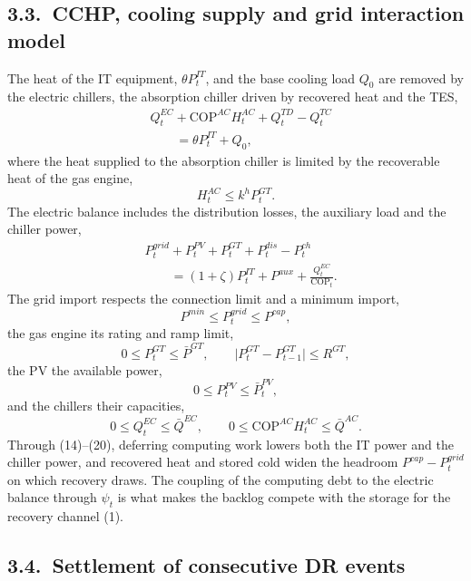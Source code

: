 \documentclass[a4paper,twocolumn,fleqn,10pt]{article}
\begin{document}
\subsection*{3.3.~CCHP, cooling supply and grid interaction model}

The heat of the IT equipment, \(\theta P^{IT}_t\), and the base cooling load \(Q_0\) are removed by the electric chillers, the absorption chiller driven by recovered heat and the TES, \[\begin{aligned}&Q^{EC}_t+\mathrm{COP}^{AC}H^{AC}_t+Q^{TD}_t-Q^{TC}_t\\&\qquad=\theta P^{IT}_t+Q_0,\end{aligned} \tag{14}\] where the heat supplied to the absorption chiller is limited by the recoverable heat of the gas engine, \[H^{AC}_t\le k^hP^{GT}_t . \tag{15}\] The electric balance includes the distribution losses, the auxiliary load and the chiller power, \[\begin{aligned}&P^{grid}_t+P^{PV}_t+P^{GT}_t+P^{dis}_t-P^{ch}_t\\&\qquad=(1+\zeta)P^{IT}_t+P^{aux}+\frac{Q^{EC}_t}{\mathrm{COP}_t}.\end{aligned} \tag{16}\] The grid import respects the connection limit and a minimum import, \[P^{min}\le P^{grid}_t\le P^{cap}, \tag{17}\] the gas engine its rating and ramp limit, \[0\le P^{GT}_t\le\bar P^{GT},\qquad \big|P^{GT}_t-P^{GT}_{t-1}\big|\le R^{GT}, \tag{18}\] the PV the available power, \[0\le P^{PV}_t\le\bar P^{PV}_t, \tag{19}\] and the chillers their capacities, \[0\le Q^{EC}_t\le\bar Q^{EC},\qquad 0\le\mathrm{COP}^{AC}H^{AC}_t\le\bar Q^{AC}. \tag{20}\] Through (14)--(20), deferring computing work lowers both the IT power and the chiller power, and recovered heat and stored cold widen the headroom \(P^{cap}-P^{grid}_t\) on which recovery draws. The coupling of the computing debt to the electric balance through \(\psi_t\) is what makes the backlog compete with the storage for the recovery channel (1).

\subsection*{3.4.~Settlement of consecutive DR events}
\end{document}

